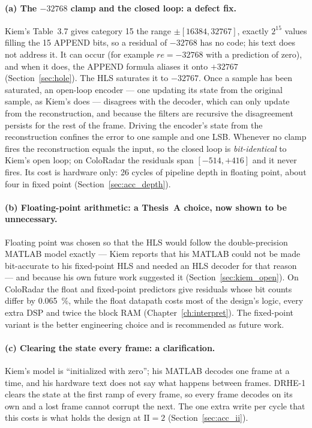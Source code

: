 \paragraph{(a) The $-32768$ clamp and the closed loop: a defect fix.} Kiem's
Table~3.7 gives category 15 the range $\pm[16384, 32767]$, exactly $2^{15}$
values filling the 15 APPEND bits, so a residual of $-32768$ has no code; his
text does not address it. It can occur (for example $re = -32768$ with a
prediction of zero), and when it does, the APPEND formula aliases it onto
$+32767$ (Section~\ref{sec:hole}). The HLS saturates it to $-32767$. Once a
sample has been saturated, an open-loop encoder --- one updating its state from
the original sample, as Kiem's does --- disagrees with the decoder, which can
only update from the reconstruction, and because the filters are recursive the
disagreement persists for the rest of the frame. Driving the encoder's state
from the reconstruction confines the error to one sample and one LSB. Whenever
no clamp fires the reconstruction equals the input, so the closed loop is
\emph{bit-identical} to Kiem's open loop; on ColoRadar the residuals span
$[-514, +416]$ and it never fires. Its cost is hardware only: 26 cycles of
pipeline depth in floating point, about four in fixed point
(Section~\ref{sec:acc_depth}).

\paragraph{(b) Floating-point arithmetic: a Thesis~A choice, now shown to be
unnecessary.} Floating point was chosen so that the HLS would follow the
double-precision MATLAB model exactly --- Kiem reports that his MATLAB could not
be made bit-accurate to his fixed-point HLS and needed an HLS decoder for that
reason --- and because his own future work suggested it
(Section~\ref{sec:kiem_open}). On ColoRadar the float and fixed-point
predictors give residuals whose bit counts differ by \SI{0.065}{\percent}, while
the float datapath costs most of the design's logic, every extra DSP and twice
the block RAM (Chapter~\ref{ch:interpret}). The fixed-point variant is the better
engineering choice and is recommended as future work.

\paragraph{(c) Clearing the state every frame: a clarification.} Kiem's model is
``initialized with zero''; his MATLAB decodes one frame at a time, and his
hardware text does not say what happens between frames. DRHE-1 clears the state
at the first ramp of every frame, so every frame decodes on its own and a lost
frame cannot corrupt the next. The one extra write per cycle that this costs is
what holds the design at $\mathrm{II} = 2$ (Section~\ref{sec:acc_ii}).

